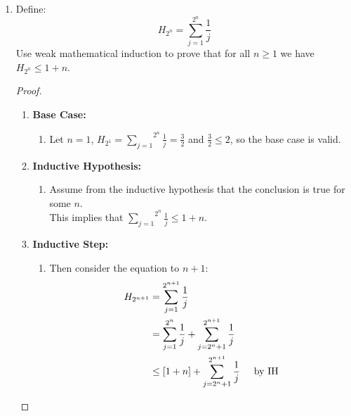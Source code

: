 \documentclass{article}
\def\inlinesum#1#2{\overset{#2}{\underset{#1}{\sum}}}
\begin{document}
\begin{enumerate}
\begin{proof}
\begin{enumerate}
\begin{enumerate}
\begin{itemize}
            \item Rotate the quadrant with the empty square such that the empty square is in the corner of the board.
            \item Therefore the $2^{n+1}\times 2^{n+1}$ chessboard can be tiled by trominoes with a corner missing.
          \end{itemize} 
        \end{enumerate}
      \item[] Thus, every $2^n \times 2^n$ chessboard with a corner missing can be tiled with trominoes.
    \end{enumerate}    
  \end{proof}
  \pagebreak

\item
  Define:
  $$H_{2^n}=\inlinesum{j=1}{2^n}\frac1j$$
  Use weak mathematical induction to prove that
  for all $n\geq 1$ we have $H_{2^n}\leq 1+n$.
  \begin{proof}
    $ $
    \begin{enumerate}
      \item[] \textbf{Base Case:}
        \begin{enumerate}
          \item[] Let $n=1$, $H_{2^1}=\inlinesum{j=1}{2^n}\frac1j = \frac32$ and $\frac32 \leq 2$, so the base case is valid.
        \end{enumerate} 
      \item[] \textbf{Inductive Hypothesis:}
        \begin{enumerate}
          \item[] Assume from the inductive hypothesis that the conclusion is true for some $n$. \\
          This implies that $\inlinesum{j=1}{2^n}\frac1j \leq 1+n$.
        \end{enumerate}
      \item[] \textbf{Inductive Step:}
        \begin{enumerate}
          \item[] Then consider the equation to $n+1$:
            \begin{align*}
              H_{2^{n+1}} &= \sum_{j=1}^{2^{n+1}} \frac{1}{j} \\
              &= \sum_{j=1}^{2^n} \frac{1}{j} + \sum_{j=2^n +1}^{2^{n+1}} \frac{1}{j} \\
              &\leq \left[1+n\right] + \sum_{j=2^n +1}^{2^{n+1}} \frac{1}{j} \hspace{5mm}\text{by IH} \\

\end{align*}
\end{enumerate}
\end{enumerate}
\end{proof}
\end{enumerate}
\end{document}
